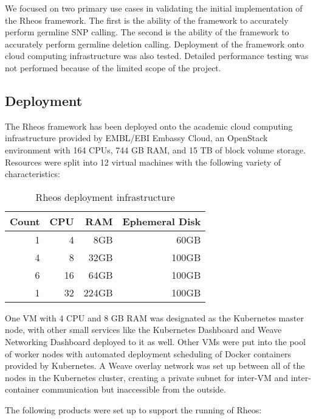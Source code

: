 We focused on two primary use cases in validating the initial implementation of the Rheos framework. The first is the ability of the framework to accurately perform germline SNP calling. The second is the ability of the framework to accurately perform germline deletion calling. Deployment of the framework onto cloud computing infrastructure was also tested. Detailed performance testing was not performed because of the limited scope of the project.

\subsection{Deployment}

The Rheos framework has been deployed onto the academic cloud computing infrastructure provided by EMBL/EBI Embassy Cloud, an OpenStack environment with 164 CPUs, 744 GB RAM, and 15 TB of block volume storage. Resources were split into 12 virtual machines with the following variety of characteristics:

\begin{table}[!ht]
    \centering
    \caption{Rheos deployment infrastructure}
    \label{tab:rheos_deployment_infrastructure}
    {\begin{tabular}{r | r | r | r}
    \toprule
    Count & CPU & RAM & Ephemeral Disk \\
    \midrule
    1 & 4 & 8GB & 60GB\\
    4 & 8 & 32GB & 100GB\\
    6 & 16 & 64GB & 100GB\\
    1 & 32 & 224GB & 100GB\\
    \bottomrule
    \end{tabular}}
\end{table}

One VM with 4 CPU and 8 GB RAM was designated as the Kubernetes master node, with other small services like the Kubernetes Dashboard and Weave Networking Dashboard deployed to it as well. Other VMs were put into the pool of worker nodes with automated deployment scheduling of Docker containers provided by Kubernetes. A Weave overlay network was set up between all of the nodes in the Kubernetes cluster, creating a private subnet for inter-VM and inter-container communication but inaccessible from the outside.

The following products were set up to support the running of Rheos:

